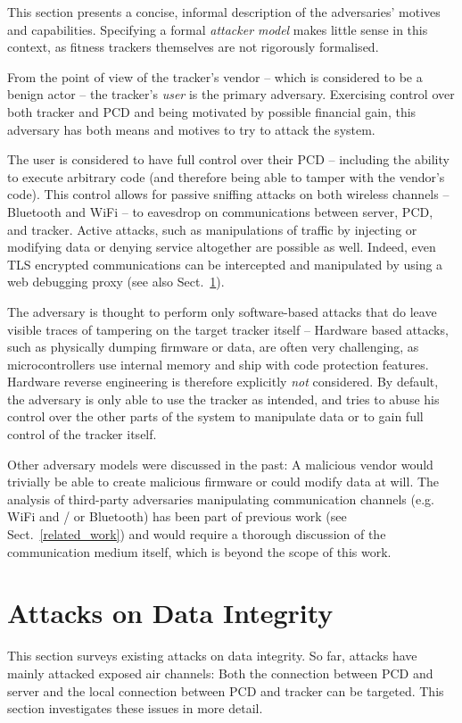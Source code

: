\documentclass[english]{lni}
\begin{document}
This section presents a concise, informal description of the adversaries' motives and capabilities. Specifying a formal \emph{attacker model} makes little sense in this context, as fitness trackers themselves are not rigorously formalised.

From the point of view of the tracker's vendor -- which is considered to be a benign actor -- the tracker's \emph{user} is the primary adversary. Exercising control over both tracker and PCD and being motivated by possible financial gain, this adversary has both means and motives to try to attack the system.

The user is considered to have full control over their PCD -- including the ability to execute arbitrary code (and therefore being able to tamper with the vendor's code). This control allows for passive sniffing attacks on both wireless channels -- Bluetooth and WiFi -- to eavesdrop on communications between server, PCD, and tracker. Active attacks, such as manipulations of traffic by injecting or modifying data or denying service altogether are possible as well. Indeed, even TLS encrypted communications can be intercepted and manipulated by using a web debugging proxy (see also Sect.~\ref{selected_attacks}).

The adversary is thought to perform only software-based attacks that do leave visible traces of tampering on the target tracker itself -- Hardware based attacks, such as physically dumping firmware or data, are often very challenging, as microcontrollers use internal memory and ship with code protection features. Hardware reverse engineering is therefore explicitly \emph{not} considered. By default, the adversary is only able to use the tracker as intended, and tries to abuse his control over the other parts of the system to manipulate data or to gain full control of the tracker itself.

Other adversary models were discussed in the past: A malicious vendor would trivially be able to create malicious firmware or could modify data at will. The analysis of third-party adversaries manipulating communication channels (e.g. WiFi and / or Bluetooth) has been part of previous work (see Sect.~\ref{related_work}) and would require a thorough discussion of the communication medium itself, which is beyond the scope of this work.

\section{Attacks on Data Integrity}
\label{selected_attacks}
This section surveys existing attacks on data integrity. So far, attacks have mainly attacked exposed air channels: Both the connection between PCD and server and the local connection between PCD and tracker can be targeted. This section investigates these issues in more detail.
\end{document}
